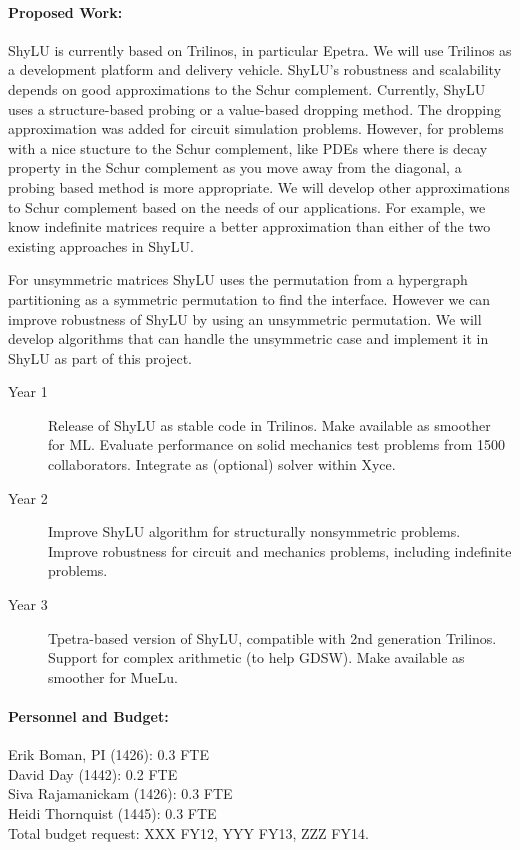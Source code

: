 \documentclass[10pt]{amsart}
\begin{document}
\paragraph{\bf Proposed Work:}
ShyLU is currently based on Trilinos, in particular Epetra.
We will use Trilinos as a development platform and delivery vehicle.
ShyLU's robustness and scalability depends on good
approximations to the Schur complement. Currently, ShyLU uses a
structure-based probing
or a value-based dropping method. The dropping approximation
was added for circuit simulation problems. However, for problems
with a nice stucture to the Schur complement, like PDEs where there is decay
property in the Schur complement as you move away from the diagonal,
a probing based method is more appropriate. We will develop other
approximations to Schur complement based on the needs of our applications. For
example, we know indefinite matrices require a better approximation than either
of the two existing approaches in ShyLU.

For unsymmetric matrices ShyLU
uses the permutation from a hypergraph partitioning as a symmetric
permutation to find the interface. However we can improve robustness of ShyLU by
using an unsymmetric permutation. We will develop algorithms that can handle
the unsymmetric case and implement it in ShyLU as part of this project.

\begin{description}
\item[Year 1] 
Release of ShyLU as stable code in Trilinos.
Make available as smoother for ML.
Evaluate performance on solid mechanics test problems from 
1500 collaborators.
Integrate as (optional) solver within Xyce. 
\item[Year 2] 
Improve ShyLU algorithm for structurally nonsymmetric problems.
Improve robustness for circuit and mechanics problems, including 
indefinite problems.
\item[Year 3] 
Tpetra-based version of ShyLU, compatible with 2nd generation Trilinos.
Support for complex arithmetic (to help GDSW).
Make available as smoother for MueLu.
\end{description}


\paragraph{\bf Personnel and Budget:}
Erik Boman, PI (1426): 0.3 FTE\\
David Day (1442): 0.2 FTE\\
Siva Rajamanickam (1426): 0.3 FTE\\
Heidi Thornquist (1445): 0.3 FTE\\

Total budget request: XXX FY12, YYY FY13, ZZZ FY14.
\end{document}
